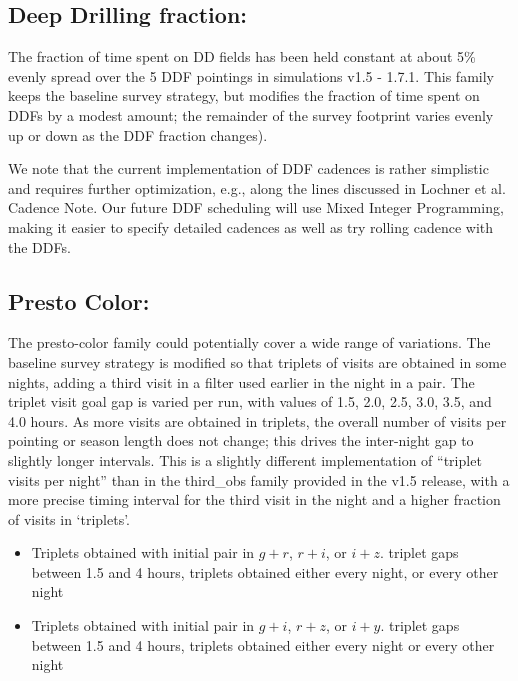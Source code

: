 \subsection{Deep Drilling fraction:}
The fraction of time spent on DD fields has been held constant at about 5\% evenly spread over the 5 DDF pointings in simulations v1.5 - 1.7.1. This family keeps the baseline survey strategy, but modifies the fraction of time spent on DDFs by a modest amount; the remainder of the survey footprint varies evenly up or down as the DDF fraction changes).

We note that the current implementation of DDF cadences is rather simplistic and requires further optimization, e.g., along the lines discussed in Lochner et al. Cadence Note. Our future DDF scheduling will use Mixed Integer Programming, making it easier to specify detailed cadences as well as try rolling cadence with the DDFs.

\subsection{Presto Color:}
The presto-color family could potentially cover a wide range of variations. The baseline survey strategy is modified so that triplets of visits are obtained in some nights, adding a third visit in a filter used earlier in the night in a pair. The triplet visit goal gap is varied per run, with values of 1.5, 2.0, 2.5, 3.0, 3.5, and 4.0 hours. As more visits are obtained in triplets, the overall number of visits per pointing or season length does not change; this drives the inter-night gap to slightly longer intervals. This is a slightly different implementation of “triplet visits per night” than in the third\_obs family provided in the v1.5 release, with a more precise timing interval for the third visit in the night and a higher fraction of visits in ‘triplets’.
\begin{itemize}
\item Triplets obtained with initial pair in $g+r$, $r+i$, or $i+z$. triplet gaps between 1.5 and 4 hours, triplets obtained either every night, or every other night
\item Triplets obtained with initial pair in $g+i$, $r+z$, or $i+y$. triplet gaps between 1.5 and 4 hours, triplets obtained either every night or every other night
\end{itemize}

